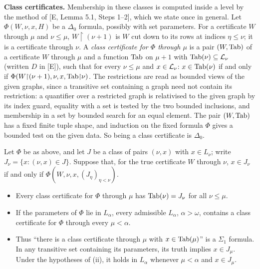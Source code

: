 \documentclass[11pt]{article}
\begin{document}
\textbf{Class certificates.} Membership in these classes is computed inside a level by the method of [E, Lemma 5.1,
Steps 1--2], which we state once in general. Let $\Phi(W, \nu, x, H)$ be a $\Delta_0$ formula, possibly with set
parameters. For a certificate $W$ through $\mu$ and $\nu \le \mu$, $W{\restriction}(\nu+1)$ is $W$ cut down to its
rows at indices $\eta \le \nu$; it is a certificate through $\nu$. A \emph{class certificate for $\Phi$ through $\mu$}
is a pair $(W, \mathrm{Tab})$ of a certificate $W$ through $\mu$ and a function $\mathrm{Tab}$ on $\mu + 1$ with $\mathrm{Tab}(\nu) \subseteq
\mathcal{L}_\nu$ (written $D$ in [E]), such that for every $\nu \le \mu$ and $x \in \mathcal{L}_\nu$: $x \in \mathrm{Tab}(\nu)$ if and only if
$\Phi(W{\restriction}(\nu+1), \nu, x, \mathrm{Tab}{\restriction}\nu)$. The restrictions are read as bounded views of the given
graphs, since a transitive set containing a graph need not contain its restriction: a quantifier over a restricted
graph is relativised to the given graph by its index guard, equality with a set is tested by the two bounded
inclusions, and membership in a set by bounded search for an equal element. The pair $(W, \mathrm{Tab})$ has a fixed finite
tuple shape, and induction on the fixed formula $\Phi$ gives a bounded test on the given data. So being a class certificate
is $\Delta_0$.

\begin{statement} Let $\Phi$ be as above, and let $J$ be a class of pairs $(\nu, x)$ with $x \in
L_\nu$; write $J_\nu = \{x : (\nu, x) \in J\}$. Suppose that, for the true certificate $W$ through $\nu$, $x \in J_\nu$
if and only if $\Phi(W, \nu, x, (J_\eta)_{\eta < \nu})$.
\begin{itemize}
\item[(i)] Every class certificate for $\Phi$ through $\mu$ has $\mathrm{Tab}(\nu) = J_\nu$ for all $\nu \le \mu$.
\item[(ii)] If the parameters of $\Phi$ lie in $L_\alpha$, every admissible $L_\alpha$, $\alpha > \omega$, contains a
  class certificate for $\Phi$ through every $\mu < \alpha$.
\item[(iii)] Thus ``there is a class certificate through $\mu$ with $x \in \mathrm{Tab}(\mu)$'' is a $\Sigma_1$ formula. In any
  transitive set containing its parameters, its truth implies $x \in J_\mu$. Under the hypotheses of (ii), it holds in
  $L_\alpha$ whenever $\mu < \alpha$ and $x \in J_\mu$.
\end{itemize}
\end{statement}
\end{document}

